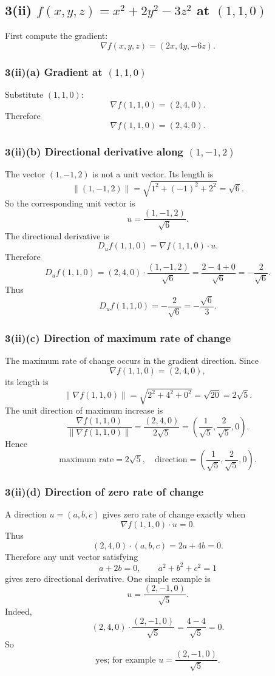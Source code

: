 \documentclass[11pt]{article}
\newcommand{\norm}[1]{\left\lVert #1\right\rVert}
\newcommand{\grad}{\nabla}
\begin{document}
\subsection*{3(ii) $f(x,y,z)=x^2+2y^2-3z^2$ at $(1,1,0)$}
First compute the gradient:
\[
 \grad f(x,y,z)=(2x,4y,-6z).
\]

\subsubsection*{3(ii)(a) Gradient at $(1,1,0)$}
Substitute $(1,1,0)$:
\[
 \grad f(1,1,0)=(2,4,0).
\]
Therefore
\[
 \boxed{\grad f(1,1,0)=(2,4,0).}
\]

\subsubsection*{3(ii)(b) Directional derivative along $(1,-1,2)$}
The vector $(1,-1,2)$ is not a unit vector.  Its length is
\[
 \norm{(1,-1,2)}=\sqrt{1^2+(-1)^2+2^2}=\sqrt6.
\]
So the corresponding unit vector is
\[
 u=\frac{(1,-1,2)}{\sqrt6}.
\]
The directional derivative is
\[
 D_u f(1,1,0)=\grad f(1,1,0)\cdot u.
\]
Therefore
\[
 D_u f(1,1,0)
 =(2,4,0)\cdot\frac{(1,-1,2)}{\sqrt6}
 =\frac{2-4+0}{\sqrt6}
 =-\frac{2}{\sqrt6}.
\]
Thus
\[
 \boxed{D_u f(1,1,0)=-\frac{2}{\sqrt6}=-\frac{\sqrt6}{3}.}
\]

\subsubsection*{3(ii)(c) Direction of maximum rate of change}
The maximum rate of change occurs in the gradient direction.  Since
\[
 \grad f(1,1,0)=(2,4,0),
\]
its length is
\[
 \norm{\grad f(1,1,0)}=\sqrt{2^2+4^2+0^2}=\sqrt{20}=2\sqrt5.
\]
The unit direction of maximum increase is
\[
 \frac{\grad f(1,1,0)}{\norm{\grad f(1,1,0)}}
 =\frac{(2,4,0)}{2\sqrt5}
 =\left(\frac1{\sqrt5},\frac2{\sqrt5},0\right).
\]
Hence
\[
 \boxed{\text{maximum rate}=2\sqrt5,\quad \text{direction}=\left(\frac1{\sqrt5},\frac2{\sqrt5},0\right).}
\]

\subsubsection*{3(ii)(d) Direction of zero rate of change}
A direction $u=(a,b,c)$ gives zero rate of change exactly when
\[
 \grad f(1,1,0)\cdot u=0.
\]
Thus
\[
 (2,4,0)\cdot(a,b,c)=2a+4b=0.
\]
Therefore any unit vector satisfying
\[
 a+2b=0,
 \qquad
 a^2+b^2+c^2=1
\]
gives zero directional derivative.  One simple example is
\[
 u=\frac{(2,-1,0)}{\sqrt5}.
\]
Indeed,
\[
 (2,4,0)\cdot\frac{(2,-1,0)}{\sqrt5}=\frac{4-4}{\sqrt5}=0.
\]
So
\[
 \boxed{\text{yes; for example }u=\frac{(2,-1,0)}{\sqrt5}.}
\]
\end{document}
